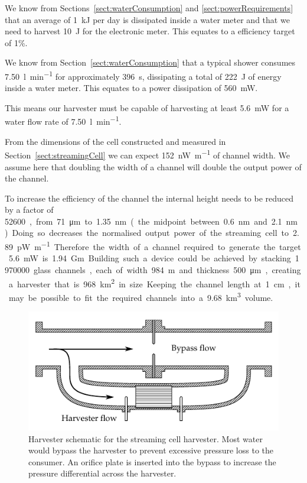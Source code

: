 \documentclass[10pt,final,journal]{IEEEtran}
\begin{document}
    We know from Sections~\ref{sect:waterConsumption} and \ref{sect:powerRequirements} that an average of \SI{1}{\kilo\joule} per day is dissipated inside a water meter and that we need to harvest \SI{10}{\joule} for the electronic meter.
    This equates to a efficiency target of 1\%.

    We know from Section~\ref{sect:waterConsumption} that a typical shower consumes \SI{7.50}{\litre\per\minute} for approximately \SI{396}{\second}, dissipating a total of \SI{222}{\joule} of energy inside a water meter.
    This equates to a power dissipation of \SI{560}{\milli\watt}.

    This means our harvester must be capable of harvesting at least \SI{5.6}{\milli\watt} for a water flow rate of \SI{7.50}{\litre\per\minute}.

    From the dimensions of the cell constructed and measured in Section~\ref{sect:streamingCell} we can expect \SI{152}{\nano\watt\per\metre} of channel width.
    We assume here that doubling the width of a channel will double the output power of the channel.

    To increase the efficiency of the channel the internal height needs to be reduced by a factor of \SI{52600}, from \SI{71}{\micro\metre} to \SI{1.35}{\nano\metre} (the midpoint between \SI{0.6}{\nano\metre} and \SI{2.1}{\nano\metre}).
    Doing so decreases the normalised output power of the streaming cell to \SI{2.89}{\pico\watt\per\metre}.
    Therefore the width of a channel required to generate the target \SI{5.6}{\milli\watt} is \SI{1.94}{\giga\metre}.

    Building such a device could be achieved by stacking \SI{1970000} glass channels, each of width \SI{984}{\metre} and thickness \SI{500}{\micro\metre}, creating a harvester that is \SI{968}{\square\kilo\metre} in size.
    Keeping the channel length at \SI{1}{\centi\meter}, it may be possible to fit the required channels into a \SI{9.68}{\cubic\kilo\meter} volume.

    \begin{figure}
        \begin{center}
        \includegraphics[]{harvester3}
        \end{center}
        \caption{Harvester schematic for the streaming cell harvester.
        Most water would bypass the harvester to prevent excessive pressure loss to the consumer.
        An orifice plate is inserted into the bypass to increase the pressure differential across the harvester.}
        \label{fig:harvester}
    \end{figure}
\end{document}
